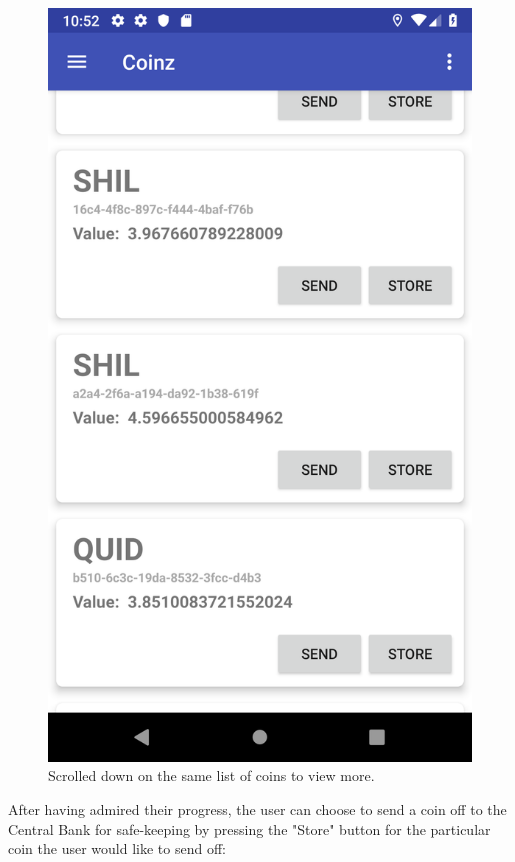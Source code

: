 \documentclass[11pt,a4paper,notitlepage]{article}
\begin{document}
\begin{figure}[H]
\begin{minipage}[t]{0.48\textwidth}
        \includegraphics[scale=0.2]{screenshots/local-wallet/scrolled-down-on-coins.png}
        \caption{Scrolled down on the same list of coins to view more.}
    \end{minipage}
\end{figure}

    After having admired their progress, the user can choose to send a coin off to the Central Bank for safe-keeping by pressing the "Store" button for the particular coin the user would like to send off:
\end{document}

